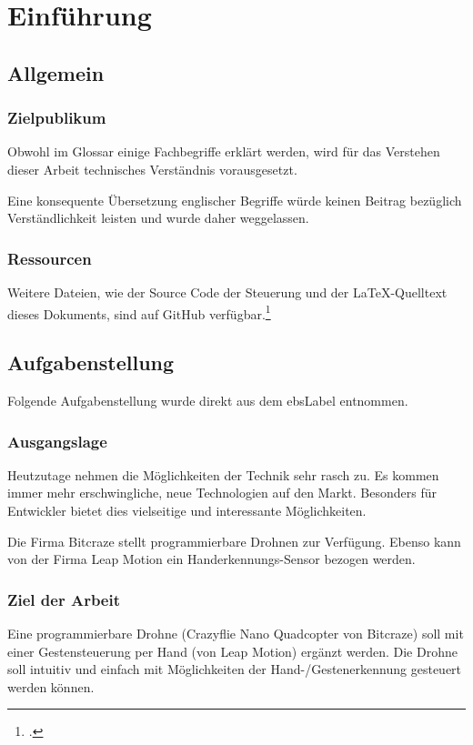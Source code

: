 \chapter{Einführung}

\section{Allgemein}

\subsection{Zielpublikum}
Obwohl im Glossar einige Fachbegriffe erklärt werden, wird für das Verstehen dieser Arbeit technisches Verständnis vorausgesetzt.

Eine konsequente Übersetzung englischer Begriffe würde keinen Beitrag bezüglich Verständlichkeit leisten und wurde daher weggelassen.

\subsection{Ressourcen}
Weitere Dateien, wie der Source Code der Steuerung und der \LaTeX-Quelltext dieses Dokuments, sind auf GitHub verfügbar.\footcite{github_droneGestures_2015-05-01}


\section{Aufgabenstellung}
\label{sec:workdef}
Folgende Aufgabenstellung wurde direkt aus dem \gls{ebsLabel} entnommen.

\subsection{Ausgangslage}
Heutzutage nehmen die Möglichkeiten der Technik sehr rasch zu. Es kommen immer mehr erschwingliche, neue Technologien auf den Markt. Besonders für Entwickler bietet dies vielseitige und interessante Möglichkeiten.

Die Firma Bitcraze stellt programmierbare Drohnen zur Verfügung. Ebenso kann von der Firma Leap Motion ein Handerkennungs-Sensor bezogen werden.

\subsection{Ziel der Arbeit}
Eine programmierbare Drohne (Crazyflie Nano Quadcopter von Bitcraze) soll mit einer Gestensteuerung per Hand (von Leap Motion) ergänzt werden.
Die Drohne soll intuitiv und einfach mit Möglichkeiten der Hand-/Gestenerkennung gesteuert werden können.

